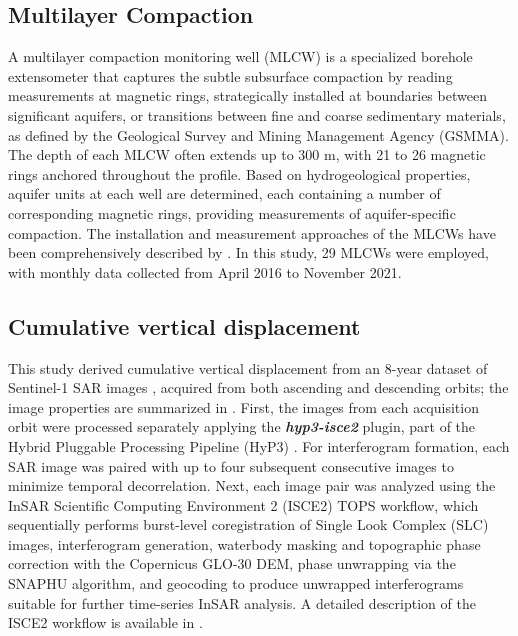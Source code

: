
\subsection{Multilayer Compaction}
\label{subsubsec:mlcw}

A multilayer compaction monitoring well (MLCW) is a specialized borehole extensometer that captures the subtle subsurface compaction by reading measurements at magnetic rings, strategically installed at boundaries between significant aquifers, or transitions between fine and coarse sedimentary materials, as defined by the Geological Survey and Mining Management Agency (GSMMA).  The depth of each MLCW often extends up to 300 m, with 21 to 26 magnetic rings anchored throughout the profile. Based on hydrogeological properties, aquifer units at each well are determined, each containing a number of corresponding magnetic rings, providing measurements of aquifer-specific compaction. The installation and measurement approaches of the MLCWs have been comprehensively described by \citep{Hung2021_MLCW}. In this study, 29 MLCWs were employed, with monthly data collected from April 2016 to November 2021.


\subsection{Cumulative vertical displacement}
\label{subsubsec:vert_disp}


This study derived cumulative vertical displacement from an 8-year dataset of Sentinel-1 SAR images , acquired from both ascending and descending orbits; the image properties are summarized in . First, the images from each acquisition orbit were processed separately applying the \textbf{\textit{hyp3-isce2}} plugin, part of the Hybrid Pluggable Processing Pipeline (HyP3) \citep{hyp3-isce2}. For interferogram formation, each SAR image was paired with up to four subsequent consecutive images to minimize temporal decorrelation. Next, each image pair was analyzed using the InSAR Scientific Computing Environment 2 (ISCE2) TOPS workflow, which sequentially performs burst-level coregistration of Single Look Complex (SLC) images, interferogram generation, waterbody masking and topographic phase correction with the Copernicus GLO-30 DEM, phase unwrapping via the SNAPHU algorithm, and geocoding to produce unwrapped interferograms suitable for further time-series InSAR analysis. A detailed description of the ISCE2 workflow is available in \citep{isce2_rosen, tops, nesd_tops}.

